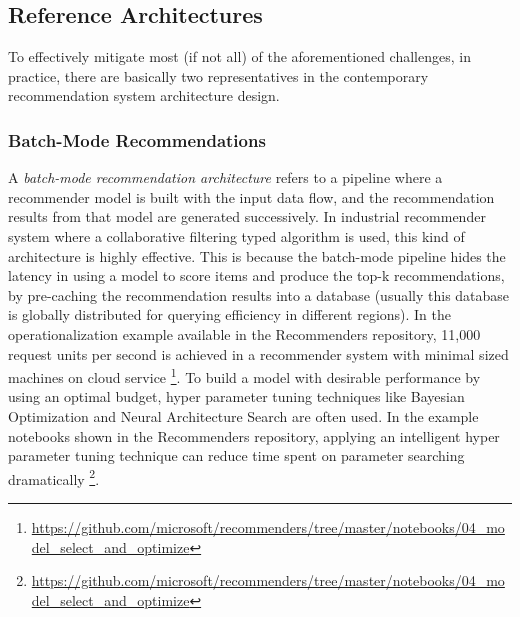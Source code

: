 \subsection{Reference Architectures}

To effectively mitigate most (if not all) of the aforementioned challenges, in practice, there are basically two representatives in the contemporary recommendation system architecture design. 

\subsubsection{Batch-Mode Recommendations}
A \textit{batch-mode recommendation architecture} refers to a pipeline where a recommender model is built with the input data flow, and the recommendation results from that model are generated successively. In industrial recommender system where a collaborative filtering typed algorithm is used, this kind of architecture is highly effective. This is because the batch-mode pipeline hides the latency in using a model to score items and produce the top-k recommendations, by pre-caching the recommendation results into a database (usually this database is globally distributed for querying efficiency in different regions). In the operationalization example available in the Recommenders repository, 11,000 request units per second is achieved in a recommender system with minimal sized machines on cloud service \footnote{\url{https://github.com/microsoft/recommenders/tree/master/notebooks/04_model_select_and_optimize}}. To build a model with desirable performance by using an optimal budget, hyper parameter tuning techniques like Bayesian Optimization \cite{snoek2012practical} and Neural Architecture Search \cite{zoph2016neural} are often used. In the example notebooks shown in the Recommenders repository, applying an intelligent hyper parameter tuning technique can reduce time spent on parameter searching dramatically \footnote{\url{https://github.com/microsoft/recommenders/tree/master/notebooks/04_model_select_and_optimize}}. 

